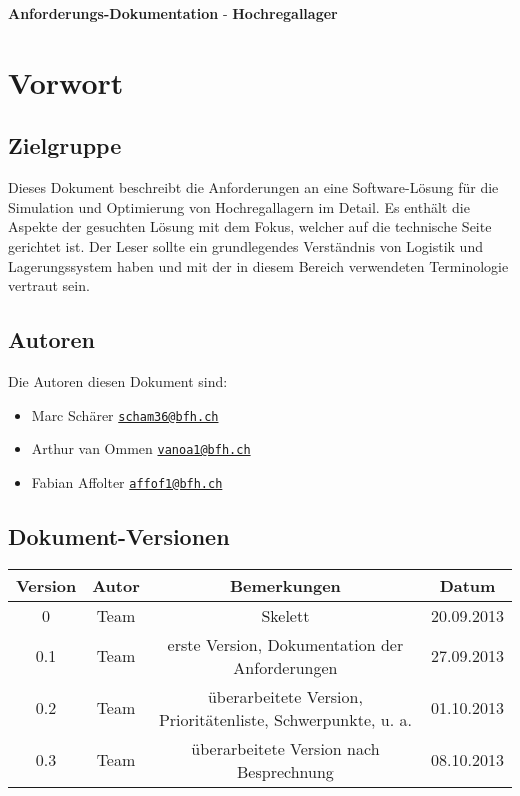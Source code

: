 \documentclass[11pt,a4paper]{article}
\begin{document}
{\huge \textbf{Anforderungs-Dokumentation}} - \textbf{Hochregallager} \\
\tableofcontents

\section{Vorwort}
%
\subsection{Zielgruppe}
Dieses Dokument beschreibt die Anforderungen an eine Software-Lösung für die Simulation und Optimierung von Hochregallagern im Detail. Es enthält die Aspekte der gesuchten Lösung mit dem Fokus, welcher auf die technische Seite gerichtet ist. Der Leser sollte ein grundlegendes Verständnis von Logistik und Lagerungssystem haben und mit der in diesem Bereich verwendeten Terminologie vertraut sein. 
%
\subsection{Autoren}
Die Autoren diesen Dokument sind:
%
\begin{itemize}
  \item Marc Schärer \href{mailto:scham36@bfh.ch}{\nolinkurl{scham36@bfh.ch}}
  \item Arthur van Ommen \href{mailto:vanoa1@bfh.ch}{\nolinkurl{vanoa1@bfh.ch}}
  \item Fabian Affolter \href{mailto:affof11@bfh.ch}{\nolinkurl{affof1@bfh.ch}}
\end{itemize}
%
\subsection{Dokument-Versionen}

\begin{table}[h]

  \begin{center}
    \begin{tabular}{|c|c|c|c|}
      \hline
      \textbf{Version} & \textbf{Autor} & \textbf{Bemerkungen} & Datum\\
      \hline
      0 & Team & Skelett & 20.09.2013\\
      0.1 & Team & erste Version, Dokumentation der Anforderungen &  27.09.2013 \\
      0.2 & Team & überarbeitete Version, Prioritätenliste, Schwerpunkte, u. a. & 01.10.2013 \\
      0.3 & Team & überarbeitete Version nach Besprechnung & 08.10.2013 \\
      \hline
    \end{tabular}
  \end{center}
\end{table}
%
%
\end{document}
